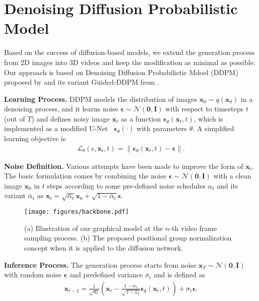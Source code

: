 \documentclass[letterpaper]{article}
\newcommand{\bx}{\mathbf{x}}
\newcommand{\bepsilon}{{\boldsymbol{\epsilon}}}
\begin{document}
\section{Denoising Diffusion Probabilistic Model}
Based on the success of diffusion-based models, we extend the generation process from 2D images into 3D videos and keep the modification as minimal as possible.
Our approach  is based on Denoising Diffusion Probabilistic Mdoel (DDPM) proposed by \citet{ho2020denoising} and its variant Guided-DDPM from \citet{dhariwal2021diffusion}.

\noindent \textbf{Learning Process.}
DDPM models the distribution of images $\bx_0\sim q(\bx_0)$ in a denoising process, and it learns noise $\bepsilon \sim \mathcal{N}(\mathbf{0}, \mathbf{I})$ with respect to timesteps $t$ (out of $T$) and defines noisy image $\bx_t$ as a function $\bepsilon_{\theta}(\bx_t, t)$, which is implemented as a modified U-Net~\cite{salimans2017pixelcnn++} $\bepsilon_\theta(\cdot)$ with parameters $\theta$.
A simplified learning objective is
\begin{align}
  \mathcal{L}_\theta(\epsilon, \bx_t, t) = \|\bepsilon_\theta(\bx_t, t) - \bepsilon\|.
\end{align}

\noindent \textbf{Noise Definition.}
Various attempts have been made to improve the form of $\bx_t$.
The basic formulation comes by combining the noise $\bepsilon \sim \mathcal{N}(\mathbf{0}, \mathbf{I})$ with a clean image $\bx_0$ in $t$ steps according to some pre-defined noise schedules $\alpha_t$ and its variant $\bar\alpha_t$ as $\bx_t = \sqrt{\bar\alpha_t}\bx_0 + \sqrt{1-\bar\alpha_t}\bepsilon$.

\begin{figure*}[htbp]
  \centering
  \texttt{[image: figures/backbone.pdf]}
  \vspace{-1\baselineskip}
  \caption{(a) Illustration of our graphical model at the $n$-th video frame sampling process. (b) The proposed positional group normalization concept when it is  applied to the diffusion network.}
  \vspace{-.5\baselineskip}
  \label{fig:pipeline}
\end{figure*}

\noindent \textbf{Inference Process.} The generation process starts from noise $\bx_T \sim \mathcal{N}(\mathbf{0}, \mathbf{I})$ with random noise $\bepsilon$ and predefined variance $\sigma_t$ and is defined as
\begin{align}
  \label{eq:inference}
  \bx_{t-1} = \frac{1}{\sqrt{\alpha_t}}\left(\bx_t - \frac{1-\alpha_t}{\sqrt{1-\bar\alpha_t}}\bepsilon_\theta(\bx_t, t)\right) + \sigma_t\bepsilon.
\end{align}
\end{document}
